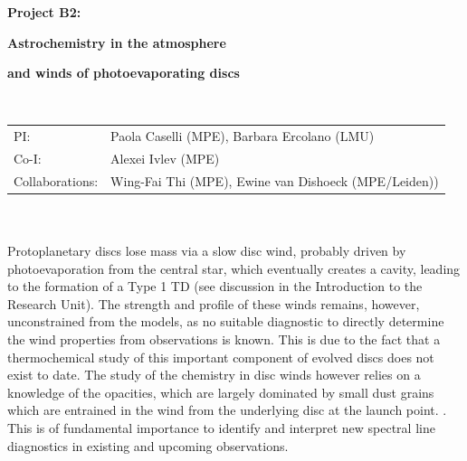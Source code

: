 \documentclass[10pt,fleqn,twoside]{article}
\begin{document}
\newpage


\setcounter{page}{1}

\centerline{\huge\bf\Tcol
%
%
%
%
%
 Project B2:}
\vspace{1em}

\centerline{\LARGE\bf\Tcol Astrochemistry in the atmosphere}\vspace{0.3em}
\centerline{\LARGE\bf\Tcol and winds of photoevaporating discs}

%
%
%
%
%
\vskip1.0cm


\\
\begin{tabular}{ll}
{\textsf{PI:}}                   & Paola Caselli (MPE), Barbara Ercolano (LMU) \\
{\textsf{Co-I:}}                & Alexei Ivlev (MPE)\\
{\textsf{Collaborations:}}      &Wing-Fai Thi (MPE), Ewine van Dishoeck (MPE/Leiden))\\
\end{tabular}


\vspace{1em}
 \\

\vspace{1em}
\\
Protoplanetary discs lose mass via a slow disc wind, probably driven
by photoevaporation from the central star, which eventually creates a
cavity, leading to the formation of a Type 1 TD (see discussion in the
Introduction to the Research Unit). The strength and profile of these
winds remains, however, unconstrained from the models, as no suitable
diagnostic to directly determine the wind properties from
observations is known. This is due to the fact that a thermochemical study of
this important component of evolved discs does not exist to date. The
study of the chemistry in disc winds however relies on a knowledge of
the opacities, which are 
largely dominated by small dust grains which are entrained in the wind
from the underlying disc at the launch point. . This is of fundamental importance to
identify and interpret new spectral line diagnostics in existing and
upcoming observations.  
\end{document}
